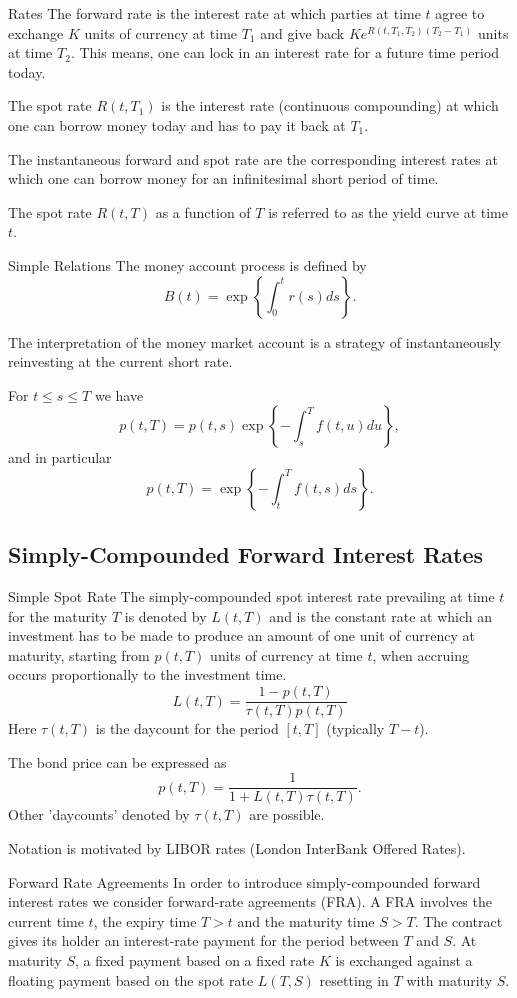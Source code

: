 Rates
	The forward rate is the interest rate at which parties
	at time $t$ agree to exchange $K$ units of currency at time $T_1$
	and give back $Ke^{R(t,T_1,T_2)(T_2-T_1)}$ units at time $T_2$.
	This means, one can lock in an interest rate for a future time
	period today. 
	
	The spot rate $R(t,T_1)$ is the interest
	rate (continuous compounding) at which one can borrow money today
	and has to pay it back at $T_1$. 
	
	The instantaneous
	forward and spot rate are the corresponding interest rates at
	which one can borrow money for an infinitesimal short period of
	time.
	
	The spot rate $R(t,T)$ as a function of $T$ is referred to as the
	yield curve at time $t$.


Simple Relations
	The money account process is defined by
		$$
		B(t) = \exp\left\{ \int_0^t r(s) ds\right\}\!.
		$$

	The interpretation of the money market account is a strategy of
	instantaneously reinvesting at the current short rate.

	For $t \leq s \leq T$ we have
		$$
		p(t,T) = p(t,s) \exp\left\{-\int_s^T f(t,u) du\right\}\!,
		$$
	and in particular
		$$
		p(t,T) = \exp\left\{-\int_t^T f(t,s) ds\right\}\!.
		$$


\subsection{Simply-Compounded Forward Interest Rates}

Simple Spot Rate
	The simply-compounded spot interest rate prevailing at time $t$ for
	the maturity $T$ is denoted by $L(t,T)$ and is the constant rate
	at which an investment has to be made to produce an amount of one
	unit of currency at maturity, starting from $p(t,T)$ units of
	currency at time $t$, when accruing occurs proportionally to the
	investment time.
		\begin{equation}\label{LIBOR-spot}
		L(t,T)=\frac{1-p(t,T)}{\tau(t,T)p(t,T)}
		\end{equation}
	Here $\tau(t,T)$ is the
	daycount for the period $[t,T]$ (typically $T-t$).

	The bond price can be expressed as
		$$
		p(t,T)=\frac{1}{1+L(t,T)\tau(t,T)}.
		$$
	Other 'daycounts' denoted  by $\tau(t,T)$ are possible.

	Notation is motivated by LIBOR rates (London InterBank Offered
	Rates).


Forward Rate Agreements
	In order to introduce simply-compounded forward interest rates we
	consider forward-rate agreements (FRA). A FRA involves the current
	time $t$, the expiry time $T>t$ and the maturity time $S>T$. The
	contract gives its holder an interest-rate payment for the period
	between $T$ and $S$. At maturity $S$, a fixed payment based on a
	fixed rate $K$ is exchanged against a floating payment based on
	the spot rate $L(T,S)$ resetting in $T$ with maturity $S$.

